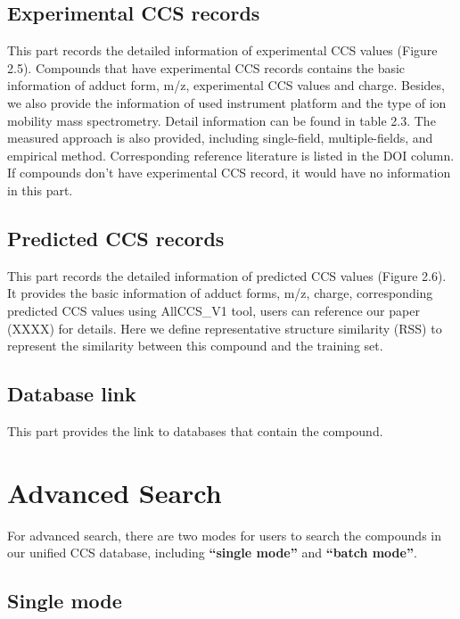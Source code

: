 \documentclass[12pt,]{book}
\theoremstyle{definition}
\theoremstyle{definition}
\theoremstyle{definition}
\theoremstyle{remark}
\begin{document}
\subsection{Experimental CCS records}\label{experimental-ccs-records}

This part records the detailed information of experimental CCS values
(Figure 2.5). Compounds that have experimental CCS records contains the
basic information of adduct form, m/z, experimental CCS values and
charge. Besides, we also provide the information of used instrument
platform and the type of ion mobility mass spectrometry. Detail
information can be found in table 2.3. The measured approach is also
provided, including single-field, multiple-fields, and empirical method.
Corresponding reference literature is listed in the DOI column. If
compounds don't have experimental CCS record, it would have no
information in this part.

\subsection{Predicted CCS records}\label{predicted-ccs-records}

This part records the detailed information of predicted CCS values
(Figure 2.6). It provides the basic information of adduct forms, m/z,
charge, corresponding predicted CCS values using AllCCS\_V1 tool, users
can reference our paper (XXXX) for details. Here we define
representative structure similarity (RSS) to represent the similarity
between this compound and the training set.

\subsection{Database link}\label{database-link}

This part provides the link to databases that contain the compound.

\section{Advanced Search}\label{advanced-search}

For advanced search, there are two modes for users to search the
compounds in our unified CCS database, including \textbf{``single
mode''} and \textbf{``batch mode''}.

\subsection{Single mode}\label{single-mode}
\end{document}
